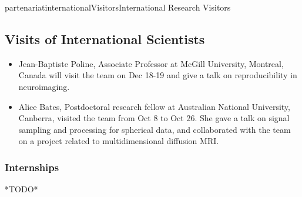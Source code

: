 \documentclass{ra2018}
\begin{document}
\begin{module}{partenariat}{internationalVisitors}{International Research Visitors}

\subsection{Visits of International Scientists}

\begin{itemize}
    \item Jean-Baptiste Poline, Associate Professor at McGill University, Montreal, Canada will visit the team on Dec 18-19 and give a talk on reproducibility in neuroimaging.
    \item Alice Bates, Postdoctoral research fellow at Australian National University, Canberra, visited the team from Oct 8 to Oct 26. She gave a talk on signal sampling and processing for spherical data, and collaborated with 
    the team on a project related to multidimensional diffusion MRI.
\end{itemize}

   \subsubsection{Internships}
   *TODO*





\end{module}
\end{document}
